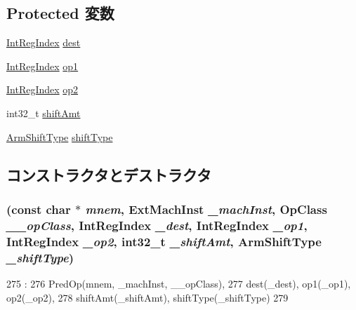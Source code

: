 \subsection*{Protected 変数}
\begin{DoxyCompactItemize}
\item 
\hyperlink{namespaceArmISA_ae64680ba9fb526106829d6bf92fc791b}{IntRegIndex} \hyperlink{classArmISA_1_1DataRegOp_aec72e8e45bdc87abeeeb75d2a8a9a716}{dest}
\item 
\hyperlink{namespaceArmISA_ae64680ba9fb526106829d6bf92fc791b}{IntRegIndex} \hyperlink{classArmISA_1_1DataRegOp_a4c465c43ad568f8bcf8ae71480e9cfea}{op1}
\item 
\hyperlink{namespaceArmISA_ae64680ba9fb526106829d6bf92fc791b}{IntRegIndex} \hyperlink{classArmISA_1_1DataRegOp_a7799ff6cbe5a252199059eb8665820e7}{op2}
\item 
int32\_\-t \hyperlink{classArmISA_1_1DataRegOp_a378dfadeb317c390962c147be928d92d}{shiftAmt}
\item 
\hyperlink{namespaceArmISA_a209d79feaaef0aa2f54ae62e53ee90de}{ArmShiftType} \hyperlink{classArmISA_1_1DataRegOp_ae5b7df4bd366c5419743bf5f679485b9}{shiftType}
\end{DoxyCompactItemize}


\subsection{コンストラクタとデストラクタ}
\hypertarget{classArmISA_1_1DataRegOp_aee3bd55c5e2d17e3a152a2b82aaa8d53}{
\subsubsection[{DataRegOp}]{ (const char $\ast$ {\em mnem}, \/  {\bf ExtMachInst} {\em \_\-machInst}, \/  OpClass {\em \_\-\_\-opClass}, \/  {\bf IntRegIndex} {\em \_\-dest}, \/  {\bf IntRegIndex} {\em \_\-op1}, \/  {\bf IntRegIndex} {\em \_\-op2}, \/  int32\_\-t {\em \_\-shiftAmt}, \/  {\bf ArmShiftType} {\em \_\-shiftType})}}
\label{classArmISA_1_1DataRegOp_aee3bd55c5e2d17e3a152a2b82aaa8d53}



\begin{DoxyCode}
275                                                           :
276         PredOp(mnem, _machInst, __opClass),
277         dest(_dest), op1(_op1), op2(_op2),
278         shiftAmt(_shiftAmt), shiftType(_shiftType)
279     {}

\end{DoxyCode}


